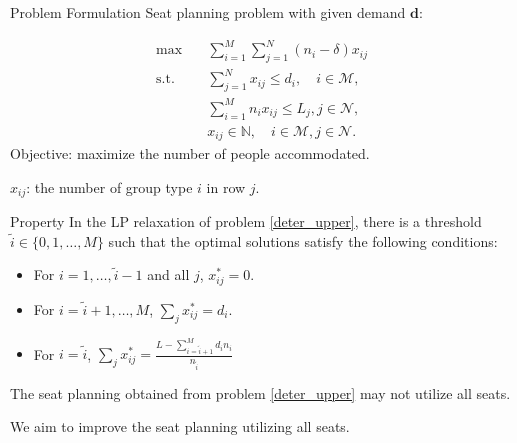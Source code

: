 \begin{frame}{Problem Formulation}  %
    Seat planning problem with given demand $\bm{d}$:

    \begin{equation}\label{deter_upper}
      \begin{aligned}
      \max \quad & \sum_{i=1}^{M}  \sum_{j= 1}^{N} (n_i- \delta) x_{ij} \\
      \text {s.t.} \quad & \sum_{j= 1}^{N} x_{ij} \leq d_{i}, \quad i \in \mathcal{M}, \\
      & \sum_{i=1}^{M} n_{i} x_{ij} \leq L_j, j \in \mathcal{N}, \\
      & x_{ij} \in \mathbb{N}, \quad i \in \mathcal{M}, j \in \mathcal{N}.
      \end{aligned}
    \end{equation}
    Objective: maximize the number of people accommodated.

    $x_{ij}$: the number of group type $i$ in row $j$.
  \end{frame}

  \begin{frame}{Property}
    In the LP relaxation of problem \eqref{deter_upper}, there is a threshold $\tilde{i} \in\{0,1,\ldots, M\}$ such that the optimal solutions satisfy the following conditions:

    \begin{itemize}
      \item For $i = 1,\ldots, \tilde{i} -1$ and all $j$, $x_{ij}^{*} = 0$. 
      \item For $i = \tilde{i} +1,\ldots, M$, $\sum_{j} x_{ij}^{*} = d_{i}$. 

      \item For $i = \tilde{i}$, $\sum_{j} x_{ij}^{*} = \frac{L - \sum_{i = \tilde{i}+1}^{M} {d_i n_i}}{n_{\tilde{i}}}$ 
    \end{itemize}

    \vspace{0.5cm}
    The seat planning obtained from problem \eqref{deter_upper} may not utilize all seats.

    \vspace{0.5cm}
    
    We aim to improve the seat planning utilizing all seats.

  \end{frame}

